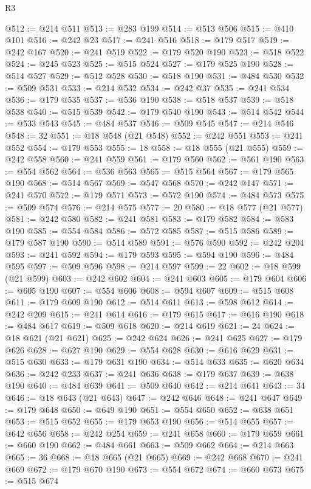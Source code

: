 \begin{lexlean}{R3}
\begin{coremodule}
@512 := @214 @511
@513 := @283 @199
@514 := @513 @506
@515 := @410 @101
@516 := @242 @23
@517 := @241 @516
@518 := @179 @517
@519 := @242 @167
@520 := @241 @519
@522 := @179 @520 @190
@523 := @518 @522
@524 := @245 @523
@525 := @515 @524
@527 := @179 @525 @190
@528 := @514 @527
@529 := @512 @528
@530 := @518 @190
@531 := @484 @530
@532 := @509 @531
@533 := @214 @532
@534 := @242 @37
@535 := @241 @534
@536 := @179 @535
@537 := @536 @190
@538 := @518 @537
@539 := @518 @538
@540 := @515 @539
@542 := @179 @540 @190
@543 := @514 @542
@544 := @533 @543
@545 := @484 @537
@546 := @509 @545
@547 := @214 @546
@548 := 32
@551 := @18 @548 (@21 @548)
@552 := @242 @551
@553 := @241 @552
@554 := @179 @553
@555 := 18
@558 := @18 @555 (@21 @555)
@559 := @242 @558
@560 := @241 @559
@561 := @179 @560
@562 := @561 @190
@563 := @554 @562
@564 := @536 @563
@565 := @515 @564
@567 := @179 @565 @190
@568 := @514 @567
@569 := @547 @568
@570 := @242 @147
@571 := @241 @570
@572 := @179 @571
@573 := @572 @190
@574 := @484 @573
@575 := @509 @574
@576 := @214 @575
@577 := 20
@580 := @18 @577 (@21 @577)
@581 := @242 @580
@582 := @241 @581
@583 := @179 @582
@584 := @583 @190
@585 := @554 @584
@586 := @572 @585
@587 := @515 @586
@589 := @179 @587 @190
@590 := @514 @589
@591 := @576 @590
@592 := @242 @204
@593 := @241 @592
@594 := @179 @593
@595 := @594 @190
@596 := @484 @595
@597 := @509 @596
@598 := @214 @597
@599 := 22
@602 := @18 @599 (@21 @599)
@603 := @242 @602
@604 := @241 @603
@605 := @179 @604
@606 := @605 @190
@607 := @554 @606
@608 := @594 @607
@609 := @515 @608
@611 := @179 @609 @190
@612 := @514 @611
@613 := @598 @612
@614 := @242 @209
@615 := @241 @614
@616 := @179 @615
@617 := @616 @190
@618 := @484 @617
@619 := @509 @618
@620 := @214 @619
@621 := 24
@624 := @18 @621 (@21 @621)
@625 := @242 @624
@626 := @241 @625
@627 := @179 @626
@628 := @627 @190
@629 := @554 @628
@630 := @616 @629
@631 := @515 @630
@633 := @179 @631 @190
@634 := @514 @633
@635 := @620 @634
@636 := @242 @233
@637 := @241 @636
@638 := @179 @637
@639 := @638 @190
@640 := @484 @639
@641 := @509 @640
@642 := @214 @641
@643 := 34
@646 := @18 @643 (@21 @643)
@647 := @242 @646
@648 := @241 @647
@649 := @179 @648
@650 := @649 @190
@651 := @554 @650
@652 := @638 @651
@653 := @515 @652
@655 := @179 @653 @190
@656 := @514 @655
@657 := @642 @656
@658 := @242 @254
@659 := @241 @658
@660 := @179 @659
@661 := @660 @190
@662 := @484 @661
@663 := @509 @662
@664 := @214 @663
@665 := 36
@668 := @18 @665 (@21 @665)
@669 := @242 @668
@670 := @241 @669
@672 := @179 @670 @190
@673 := @554 @672
@674 := @660 @673
@675 := @515 @674

\end{coremodule}
\end{lexlean}
